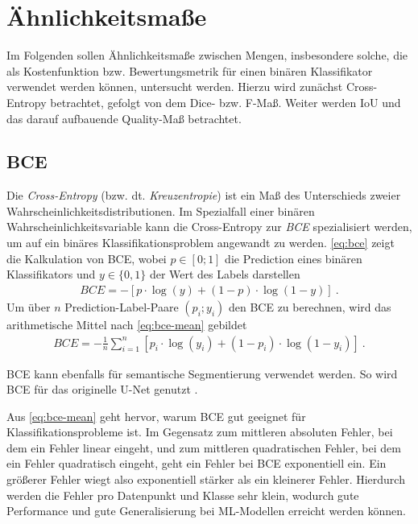 \section{Ähnlichkeitsmaße} \label{sec:evaluation-metrics}

Im Folgenden sollen Ähnlichkeitsmaße zwischen Mengen, insbesondere 
solche, die als Kostenfunktion bzw. Bewertungsmetrik für einen binären 
Klassifikator verwendet werden können, untersucht werden. Hierzu wird zunächst Cross-Entropy betrachtet,
gefolgt von dem Dice- bzw. F-Maß. Weiter werden \ac{IoU} und das darauf aufbauende Quality-Maß betrachtet.

\subsection{\acf{BCE}}

Die \textit{Cross-Entropy} (bzw. dt. \textit{Kreuzentropie}) ist ein Maß des Unterschieds zweier
Wahrscheinlichkeitsdistributionen. Im Spezialfall einer binären Wahrscheinlichkeitsvariable 
kann die Cross-Entropy zur \textit{\acf{BCE}} spezialisiert werden, um auf ein binäres 
Klassifikationsproblem angewandt zu werden. 
\autoref{eq:bce} zeigt die Kalkulation von \ac{BCE}, wobei $p \in [0;1]$ die Prediction 
eines binären Klassifikators und $y \in \{0,1\}$ der Wert des Labels darstellen
\begin{align}
	\label{eq:bce} BCE = -[p \cdot \log(y) + (1-p) \cdot \log(1-y) ]~.
\end{align} 
Um über $n$ Prediction-Label-Paare $(p_i; y_i)$ den \ac{BCE} zu berechnen, wird das arithmetische Mittel nach
\autoref{eq:bce-mean} gebildet \cites{Cybenko.1999}{Murphy.2012}
\begin{align}
	\label{eq:bce-mean} BCE = -\frac{1}{n}\sum_{i = 1}^{n}[p_i \cdot \log(y_i) + (1-p_i) \cdot \log(1-y_i) ]~.
\end{align}

\acf{BCE} kann ebenfalls für semantische Segmentierung verwendet werden. So wird \acf{BCE} 
für das originelle U-Net genutzt \cite{Ronneberger.18052015}. 

Aus \autoref{eq:bce-mean} geht hervor, warum \ac{BCE} gut geeignet für Klassifikationsprobleme ist.
Im Gegensatz zum mittleren absoluten Fehler, bei dem ein Fehler linear eingeht, und zum mittleren quadratischen Fehler,
bei dem ein Fehler quadratisch eingeht, geht ein Fehler bei \ac{BCE} exponentiell ein. 
Ein größerer Fehler wiegt also exponentiell stärker als ein kleinerer Fehler. 
Hierdurch werden die Fehler pro Datenpunkt und Klasse sehr klein, 
wodurch gute Performance und gute Generalisierung bei \ac{ML}-Modellen erreicht werden können. \\

